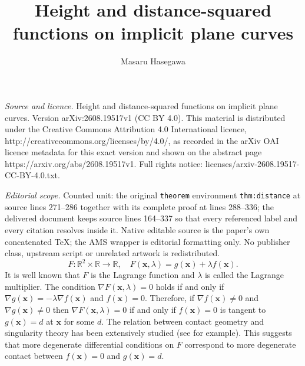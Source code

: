 \documentclass[10pt,a4paper]{amsart}
\newcommand{\R}{\mathbb{R}}
\newcommand{\x}{\mathbf{x}}
\begin{document}
\title[Height and distance-squared functions on implicit plane curv]{Height and distance-squared functions on implicit plane curves}
\author{Masaru Hasegawa}
\date{}
\maketitle
\noindent\emph{Source and licence.} Height and distance-squared functions on implicit plane curves. Version arXiv:2608.19517v1 (CC BY 4.0). This material is distributed under the Creative Commons Attribution 4.0 International licence, http://creativecommons.org/licenses/by/4.0/, as recorded in the arXiv OAI licence metadata for this exact version and shown on the abstract page https://arxiv.org/abs/2608.19517v1. Full rights notice: licenses/arxiv-2608.19517-CC-BY-4.0.txt.\par\smallskip
\noindent\textit{Editorial scope.} Counted unit: the original \texttt{theorem} environment \texttt{thm:distance} at source lines 271--286 together with its complete proof at lines 288--336; the delivered document keeps source lines 164--337 so that every referenced label and every citation resolves inside it. Native editable source is the paper's own concatenated TeX; the AMS wrapper is editorial formatting only. No publisher class, upstream script or unrelated artwork is redistributed.
\begin{equation*}
F:\R^2\times\R\to\R,\quad F(\x,\lambda)=g(\x)+\lambda f(\x).
\end{equation*}
It is well known that $F$ is the Lagrange function and $\lambda$ is
called the Lagrange multiplier. 
The condition $\nabla F(\x,\lambda) = 0$ holds if and only if $\nabla g(\x)=-\lambda\nabla f(\x)$ and $f(\x)=0$. 
Therefore, if $\nabla f(\x)\ne 0$ and $\nabla g(\x) \ne 0$ then $\nabla F(\x,\lambda) = 0$ if and only if $f(\x)=0$ is tangent to $g(\x)=d$ at $\x$ for some $d$. 
The relation between contact geometry and singularity theory has been extensively studied (see \cite{IRRT2015} for example).
This suggests that more degenerate differential conditions on $F$ correspond to more degenerate contact between $f(\x)=0$ and $g(\x)=d$.  
\end{document}
